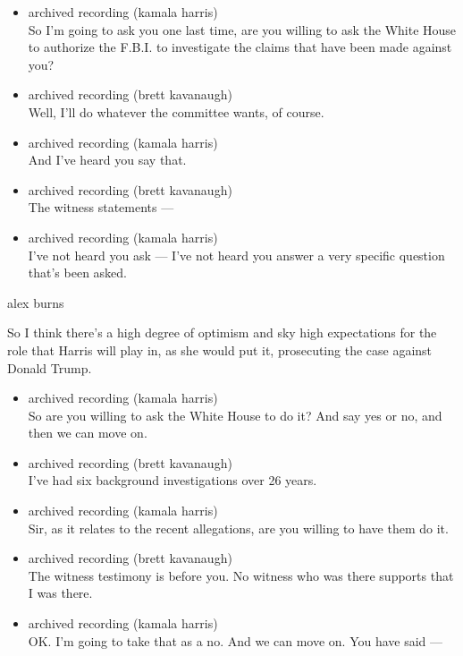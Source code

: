 \begin{itemize}
\item
  archived recording (kamala harris)\\
  So I'm going to ask you one last time, are you willing to ask the
  White House to authorize the F.B.I. to investigate the claims that
  have been made against you?
\item
  archived recording (brett kavanaugh)\\
  Well, I'll do whatever the committee wants, of course.
\item
  archived recording (kamala harris)\\
  And I've heard you say that.
\item
  archived recording (brett kavanaugh)\\
  The witness statements ---
\item
  archived recording (kamala harris)\\
  I've not heard you ask --- I've not heard you answer a very specific
  question that's been asked.
\end{itemize}

alex burns

So I think there's a high degree of optimism and sky high expectations
for the role that Harris will play in, as she would put it, prosecuting
the case against Donald Trump.

\begin{itemize}
\item
  archived recording (kamala harris)\\
  So are you willing to ask the White House to do it? And say yes or no,
  and then we can move on.
\item
  archived recording (brett kavanaugh)\\
  I've had six background investigations over 26 years.
\item
  archived recording (kamala harris)\\
  Sir, as it relates to the recent allegations, are you willing to have
  them do it.
\item
  archived recording (brett kavanaugh)\\
  The witness testimony is before you. No witness who was there supports
  that I was there.
\item
  archived recording (kamala harris)\\
  OK. I'm going to take that as a no. And we can move on. You have said
  ---
\end{itemize}


